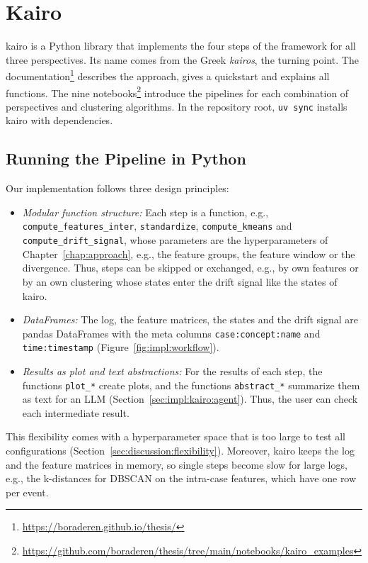 \section{Kairo}
\label{sec:impl:kairo}
kairo is a Python library that implements the four steps of the framework for all three perspectives. Its name comes from the Greek \emph{kairos}, the turning point. The documentation\footnote{\url{https://boraderen.github.io/thesis/}} describes the approach, gives a quickstart and explains all functions. The nine notebooks\footnote{\url{https://github.com/boraderen/thesis/tree/main/notebooks/kairo_examples}} introduce the pipelines for each combination of perspectives and clustering algorithms. In the repository root, \texttt{uv sync} installs kairo with dependencies.

\subsection{Running the Pipeline in Python}
\label{sec:impl:kairo:pipeline}
Our implementation follows three design principles:
\begin{itemize}
	\item \emph{Modular function structure:} Each step is a function, e.g., \texttt{compute\_features\_inter}, \texttt{standardize}, \texttt{compute\_kmeans} and \texttt{compute\_drift\_signal}, whose parameters are the hyperparameters of Chapter~\ref{chap:approach}, e.g., the feature groups, the feature window or the divergence. Thus, steps can be skipped or exchanged, e.g., by own features or by an own clustering whose states enter the drift signal like the states of kairo.
	\item \emph{DataFrames:} The log, the feature matrices, the states and the drift signal are pandas DataFrames with the meta columns \texttt{case:concept:name} and \texttt{time:timestamp} (Figure~\ref{fig:impl:workflow}).
	\item \emph{Results as plot and text abstractions:} For the results of each step, the functions \texttt{plot\_*} create plots, and the functions \texttt{abstract\_*} summarize them as text for an LLM (Section~\ref{sec:impl:kairo:agent}). Thus, the user can check each intermediate result.
\end{itemize}
This flexibility comes with a hyperparameter space that is too large to test all configurations (Section~\ref{sec:discussion:flexibility}). Moreover, kairo keeps the log and the feature matrices in memory, so single steps become slow for large logs, e.g., the k-distances for DBSCAN on the intra-case features, which have one row per event.


